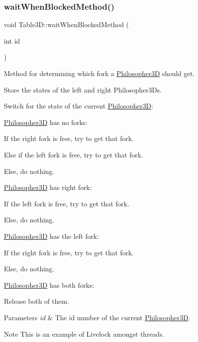 \subsubsection{\texorpdfstring{wait\+When\+Blocked\+Method()}{waitWhenBlockedMethod()}}
{\footnotesize\ttfamily void Table3\+D\+::wait\+When\+Blocked\+Method (\begin{DoxyParamCaption}\item[{int}]{id }\end{DoxyParamCaption})}



Method for determining which fork a \hyperlink{class_philosopher3_d}{Philosopher3D} should get. 


\begin{DoxyItemize}
\item Store the states of the left and right Philosopher3\+Ds.
\item Switch for the state of the current \hyperlink{class_philosopher3_d}{Philosopher3D}\+:
\begin{DoxyItemize}
\item \hyperlink{class_philosopher3_d}{Philosopher3D} has no forks\+:
\begin{DoxyItemize}
\item If the right fork is free, try to get that fork.
\item Else if the left fork is free, try to get that fork.
\item Else, do nothing.
\end{DoxyItemize}
\item \hyperlink{class_philosopher3_d}{Philosopher3D} has right fork\+:
\begin{DoxyItemize}
\item If the left fork is free, try to get that fork.
\item Else, do nothing.
\end{DoxyItemize}
\item \hyperlink{class_philosopher3_d}{Philosopher3D} has the left fork\+:
\begin{DoxyItemize}
\item If the right fork is free, try to get that fork.
\item Else, do nothing.
\end{DoxyItemize}
\item \hyperlink{class_philosopher3_d}{Philosopher3D} has both forks\+:
\begin{DoxyItemize}
\item Release both of them.
\end{DoxyItemize}
\end{DoxyItemize}
\end{DoxyItemize}
\begin{DoxyParams}{Parameters}
{\em id} & The id number of the current \hyperlink{class_philosopher3_d}{Philosopher3D}. \\
\hline
\end{DoxyParams}
\begin{DoxyNote}{Note}
This is an example of Livelock amongst threads. 
\end{DoxyNote}


